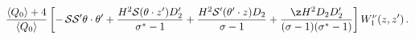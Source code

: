 \begin{equation*}
\frac{\langle Q_{0}\rangle+4}{\langle Q_{0}\rangle }\left[-\,{\cal
S }{\cal S' } \theta\cdot\theta'+\frac{H^{2}{\cal S }(\theta\cdot
z')D'_{2}}{\sigma^{*}-1}+\frac{H^{2}{\cal S' }(\theta'\cdot
z)D_{2}}{\sigma-1}+\frac{\z H^{2}D_{2}D'_{2}}{
(\sigma-1)(\sigma^{*}-1)}\right]W_{1}^{\nu}(z,z')\,.
\end{equation*}

